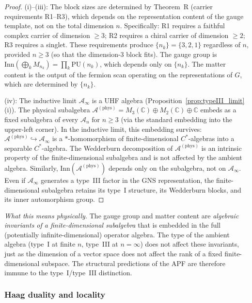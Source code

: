 \documentclass[11pt,a4paper]{article}
\theoremstyle{definition}
\begin{document}
\begin{proof}
(i)--(iii): The block sizes are determined by Theorem~R (carrier
requirements R1--R3), which depends on the representation content of
the gauge template, not on the total dimension $n$.  Specifically: R1
requires a faithful complex carrier of dimension $\ge 3$; R2 requires
a chiral carrier of dimension $\ge 2$; R3 requires a singlet.
These requirements produce $\{n_k\} = \{3, 2, 1\}$ regardless of $n$,
provided $n \ge 3$ (so that the dimension-3 block fits).  The gauge
group is $\mathrm{Inn}(\bigoplus_k M_{n_k}) = \prod_k \mathrm{PU}(n_k)$,
which depends only on $\{n_k\}$.  The matter content is the output of
the fermion scan operating on the representations of $G$, which are
determined by $\{n_k\}$.

(iv): The inductive limit $\mathcal{A}_\infty$ is a UHF algebra
(Proposition~\ref{prop:typeIII_limit}(i)).  The physical subalgebra
$\mathcal{A}^{(\mathrm{phys})} = M_3(\mathbb{C}) \oplus
M_2(\mathbb{C}) \oplus \mathbb{C}$ embeds as a fixed subalgebra of
every $\mathcal{A}_n$ for $n \ge 3$ (via the standard embedding into
the upper-left corner).  In the inductive limit, this embedding
survives: $\mathcal{A}^{(\mathrm{phys})} \hookrightarrow
\mathcal{A}_\infty$ is a $*$-homomorphism of finite-dimensional
$C^*$-algebras into a separable $C^*$-algebra.  The
Wedderburn decomposition of $\mathcal{A}^{(\mathrm{phys})}$ is an
intrinsic property of the finite-dimensional subalgebra and is not
affected by the ambient algebra.  Similarly,
$\mathrm{Inn}(\mathcal{A}^{(\mathrm{phys})})$ depends only on the
subalgebra, not on $\mathcal{A}_\infty$.  Even if
$\mathcal{A}_\infty$ generates a type~III factor in the GNS
representation, the finite-dimensional subalgebra retains its
type~I structure, its Wedderburn blocks, and its inner automorphism
group.
\end{proof}

\noindent\textit{What this means physically.}\quad
The gauge group and matter content are \emph{algebraic invariants of a
finite-dimensional subalgebra} that is embedded in the full
(potentially infinite-dimensional) operator algebra.  The type of the
ambient algebra (type~I at finite $n$, type~III at $n = \infty$)
does not affect these invariants, just as the dimension of a vector
space does not affect the rank of a fixed finite-dimensional subspace.
The structural predictions of the APF are therefore immune to the
type~I/type~III distinction.


\subsubsection{Haag duality and locality}
\label{sec:haag_duality}
\end{document}
